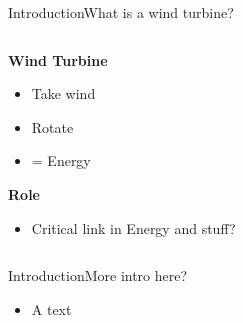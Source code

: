\begin{frame}{Introduction}{What is a wind turbine?}
 		\begin{columns}
 		\begin{column}{.5\textwidth}
 			\textbf{Wind Turbine}
	 			\begin{itemize}
		 			\item Take wind
		 			\item Rotate
		 			\item = Energy			
		 		\end{itemize} \bigskip\bigskip
 			\textbf{Role} 
		 		\begin{itemize}
		 			\item Critical link in Energy and stuff?		
		 		\end{itemize}
 		\end{column}
 	\end{columns}	
\end{frame}


\begin{frame}{Introduction}{More intro here?}
	\begin{itemize}
		\item A text
	\end{itemize}\bigskip
\end{frame}


%
